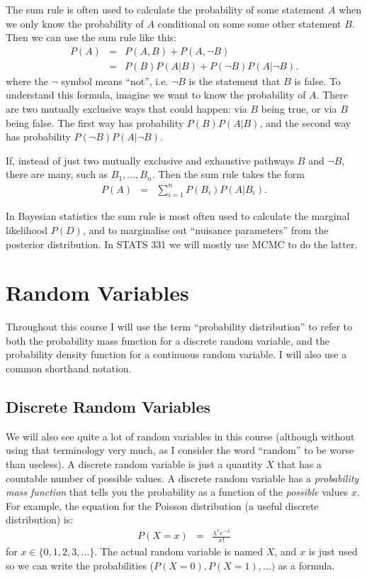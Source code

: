 The sum rule is often used to calculate the
probability of some statement
$A$ when we only know the probability of $A$ conditional on some
some other statement $B$. Then we
can use the sum rule like this:
\begin{eqnarray}
P(A) &=& P(A, B) + P(A, \neg B)\\
&=& P(B)P(A|B) + P(\neg B)P(A|\neg B).
\end{eqnarray}
where the $\neg$ symbol means ``not'', i.e. $\neg B$ is the statement that
$B$ is false. To understand
this formula, imagine we want to know the probability of $A$. There are
two mutually exclusive ways that could happen: via $B$ being true, or via $B$
being false. The first way has probability $P(B)P(A|B)$, and the second way
has probability $P(\neg B)P(A|\neg B)$.

If, instead of just two mutually exclusive and exhaustive
pathways $B$ and $\neg B$, there are many, such as $B_1, ..., B_n$.
Then the sum rule takes the form
\begin{eqnarray}
P(A) &=& \sum_{i=1}^n P(B_i)P(A|B_i).
\end{eqnarray}

In Bayesian statistics the sum rule is most often used to calculate the
marginal likelihood $P(D)$, and to marginalise out ``nuisance
parameters'' from the posterior distribution. In STATS 331 we will mostly use
MCMC to do the latter.

\section{Random Variables}
Throughout this course I will use the term ``probability distribution'' to
refer to both the probability mass function for a discrete random variable, and
the probability density function for a continuous random variable. I will also
use a common shorthand notation.

\subsection{Discrete Random Variables}
We will also see quite a lot of random variables in this course (although
without using that terminology very much, as I consider the word ``random'' to be
worse than useless). A discrete
random variable is just a quantity $X$ that has a countable number of possible
values. A discrete random variable has a {\it probability mass function}
that tells you the probability as a function of the {\it possible} values $x$.
For example, the equation for the Poisson distribution (a useful discrete
distribution) is:
\begin{eqnarray}
P(X=x) &=& \frac{\lambda^x e^{-\lambda}}{x!}\label{eq:poisson}
\end{eqnarray}
for $x \in \{0, 1, 2, 3, ...\}$. The actual random variable is named $X$, and
$x$ is just used so we can write the probabilities ($P(X=0), P(X=1), ...)$ as
a formula.

